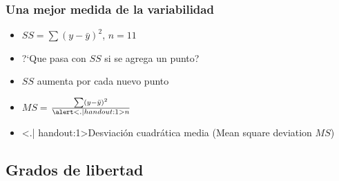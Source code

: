 \documentclass[mathserif]{beamer}
\begin{document}
\begin{frame}[label=var2]
   \frametitle{Una mejor medida de la variabilidad}
    \begin{itemize}[<+-| visible@+-| handout:1>]
      \item $SS=\sum(y-\bar{y})^2$, $n=11$ 
      \item ?`Que pasa con $SS$ si se agrega un punto?
      \item $SS$ aumenta por cada nuevo punto
      \smallskip
      \item $MS=$\LARGE{$\frac{\sum(y-\bar{y})^2}{\alert<.| handout:1>{n}}$}
      \smallskip
      \item \alert<.| handout:1>{Desviaci\'on cuadr\'atica media} (Mean square deviation $MS$)
   \end{itemize}
\end{frame}%


\subsection[Grados de libertad]{Grados de libertad}
\end{document}
